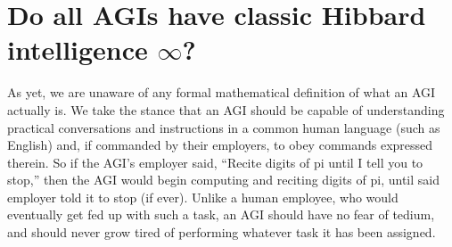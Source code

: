 \documentclass{article}
\begin{document}
\section{Do all AGIs have classic Hibbard intelligence $\infty$?}
\label{agiperspectivesection}

As yet, we are unaware of any formal mathematical definition of what an AGI
actually is. We take the stance that an AGI should be capable of understanding
practical conversations and instructions in a common human language (such as
English) and, if commanded by their employers, to obey commands expressed
therein. So if the AGI's employer said, ``Recite digits of pi until I tell you to
stop,'' then the AGI would begin computing and reciting digits of pi, until said
employer told it to stop (if ever). Unlike a human employee, who would eventually
get fed up with such a task, an AGI should have no fear of tedium, and should
never grow tired of performing whatever task it has been assigned.
\end{document}
